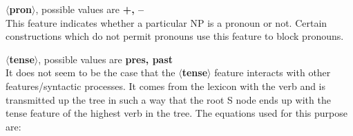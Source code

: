 
\noindent
{\bf $\langle$pron$\rangle$}, possible values are {\bf +, --}\\
This feature indicates whether a particular NP is a pronoun or not. 
Certain constructions which do not permit pronouns use this 
feature to block pronouns.

\noindent
{\bf $\langle$tense$\rangle$}, possible values are {\bf pres, past}\\
It does not seem to be the case that the {\bf $\langle$tense$\rangle$}
feature interacts with other features/syntactic processes. It 
comes from the lexicon with the verb and is transmitted up the
tree in such a way that the root S node ends up with the
tense feature of the highest verb in the tree. The equations
used for this purpose are:




